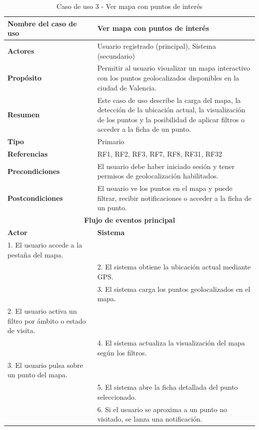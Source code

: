 \begin{table}[H]
\centering
\caption{Caso de uso 3 - Ver mapa con puntos de interés}
\begin{tabular}{|p{4.5cm}|p{10.5cm}|}
\hline
\textbf{Nombre del caso de uso} & Ver mapa con puntos de interés \\
\hline
\textbf{Actores} & Usuario registrado (principal), Sistema (secundario) \\
\hline
\textbf{Propósito} & Permitir al usuario visualizar un mapa interactivo con los puntos geolocalizados disponibles en la ciudad de Valencia. \\
\hline
\textbf{Resumen} & Este caso de uso describe la carga del mapa, la detección de la ubicación actual, la visualización de los puntos y la posibilidad de aplicar filtros o acceder a la ficha de un punto. \\
\hline
\textbf{Tipo} & Primario \\
\hline
\textbf{Referencias} & RF1, RF2, RF3, RF7, RF8, RF31, RF32 \\
\hline
\textbf{Precondiciones} & El usuario debe haber iniciado sesión y tener permisos de geolocalización habilitados. \\
\hline
\textbf{Postcondiciones} & El usuario ve los puntos en el mapa y puede filtrar, recibir notificaciones o acceder a la ficha de un punto. \\
\hline
\multicolumn{2}{|c|}{\textbf{Flujo de eventos principal}} \\
\hline
\textbf{Actor} & \textbf{Sistema} \\
\hline
1. El usuario accede a la pestaña del mapa. & \\
\hline
& 2. El sistema obtiene la ubicación actual mediante GPS. \\
\hline
& 3. El sistema carga los puntos geolocalizados en el mapa. \\
\hline
2. El usuario activa un filtro por ámbito o estado de visita. & \\
\hline
& 4. El sistema actualiza la visualización del mapa según los filtros. \\
\hline
3. El usuario pulsa sobre un punto del mapa. & \\
\hline
& 5. El sistema abre la ficha detallada del punto seleccionado. \\
\hline
& 6. Si el usuario se aproxima a un punto no visitado, se lanza una notificación. \\
\hline
\end{tabular}
\end{table}

